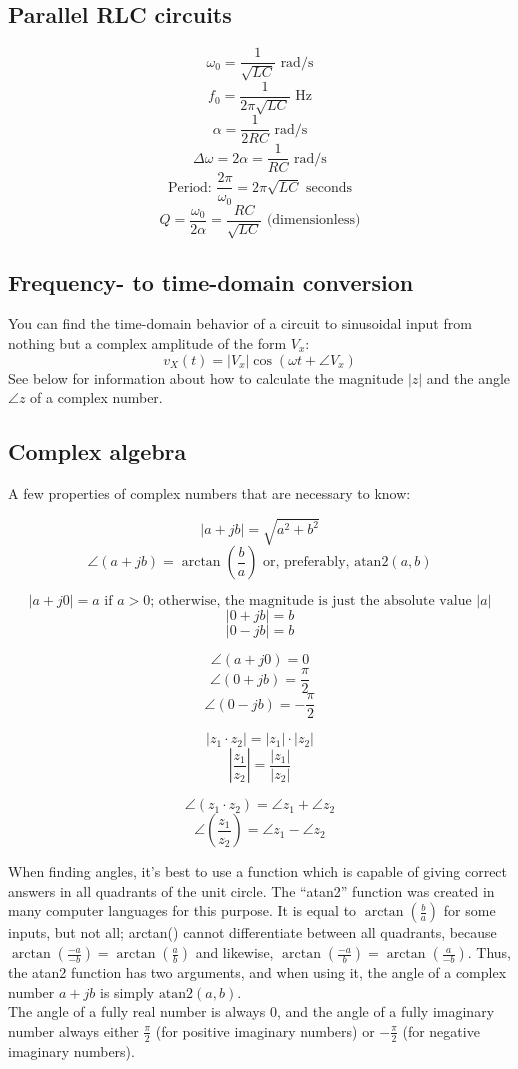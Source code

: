 \documentclass[12pt,a4paper]{report}
\begin{document}
\subsection{Parallel RLC circuits}

\[ \omega_0 = \frac{1}{\sqrt{LC}} \text{ rad/s} \]
\[ f_0 = \frac{1}{2\pi \sqrt{LC}} \text { Hz} \]
\[ \alpha = \frac{1}{2RC} \text{ rad/s} \]
\[ \Delta \omega = 2\alpha = \frac{1}{RC} \text { rad/s} \]
\[ \text{Period: } \frac{2\pi}{\omega_0} = 2\pi \sqrt{LC} \text { seconds} \]
\[ Q = \frac{\omega_0}{2\alpha} = \frac{RC}{\sqrt{LC}} \text { (dimensionless)} \]

\subsection{Frequency- to time-domain conversion}
You can find the time-domain behavior of a circuit to sinusoidal input from nothing but a complex amplitude of the form $V_x$:
\[ v_X(t) = |V_x| \cos{(\omega t + \angle V_x)} \]
See below for information about how to calculate the magnitude $|z|$ and the angle $\angle z$ of a complex number.

\subsection{Complex algebra}
A few properties of complex numbers that are necessary to know:

\[ |a + jb| = \sqrt{a^2 + b^2} \]
\[ \angle (a + jb) = \arctan{(\frac{b}{a})} \text{ or, preferably, } \text{atan2}(a, b) \]

\[ |a + j0| = a \text { if $a > 0$; otherwise, the magnitude is just the absolute value } |a| \]
\[ |0 + jb| = b \]
\[ |0 - jb| = b \]

\[ \angle (a + j0) = 0 \]
\[ \angle (0 + jb) = \frac{\pi}{2} \]
\[ \angle (0 - jb) = -\frac{\pi}{2} \]

\[ |z_1 \cdot z_2| = |z_1| \cdot |z_2| \]
\[ \left| \frac{z_1}{z_2} \right| = \frac{|z_1|}{|z_2|} \]

\[ \angle (z_1 \cdot z_2) = \angle z_1 + \angle z_2 \]
\[ \angle \left( \frac{z_1}{z_2} \right) = \angle z_1 - \angle z_2 \]

When finding angles, it's best to use a function which is capable of giving correct answers in all quadrants of the unit circle. The ``atan2'' function was created in many computer languages for this purpose. It is equal to $\displaystyle \arctan{(\frac{b}{a})}$ for some inputs, but not all; arctan() cannot differentiate between all quadrants, because $\displaystyle \arctan{\left( \frac{-a}{-b}\right )} = \arctan{\left( \frac{a}{b}\right) }$ and likewise, $\displaystyle \arctan{\left( \frac{-a}{b}\right )} = \arctan{\left( \frac{a}{-b}\right) }$. Thus, the atan2 function has two arguments, and when using it, the angle of a complex number $a + jb$ is simply $\text{atan2}(a, b)$.\\
The angle of a fully real number is always $0$, and the angle of a fully imaginary number always either $\displaystyle \frac{\pi}{2}$ (for positive imaginary numbers) or $\displaystyle -\frac{\pi}{2}$ (for negative imaginary numbers).
\end{document}
